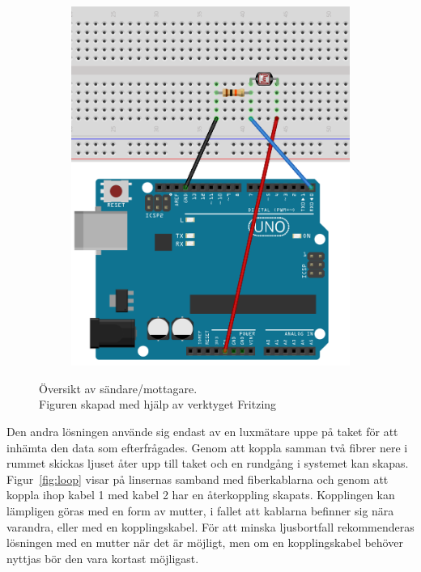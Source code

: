 \begin{figure}[hb]
\begin{subfigure}[b]{0.35\textwidth}
                    \includegraphics[width=\textwidth]{res/img/resistor}    
                \end{subfigure}
            \caption[Översikt av sändare/mottagare]{Översikt av sändare/mottagare. \\\tiny{Figuren skapad med hjälp av verktyget Fritzing \cite{fritz}}}\label{fig:schema}
            \end{figure}

            \newpage
            
            Den andra lösningen använde sig endast av en luxmätare uppe på taket för att inhämta den data som efterfrågades. Genom att koppla samman två fibrer nere i rummet skickas ljuset åter upp till taket och en rundgång i systemet kan skapas. Figur~\ref{fig:loop} visar på linsernas samband med fiberkablarna och genom att koppla ihop kabel 1 med kabel 2 har en återkoppling skapats. Kopplingen kan lämpligen göras med en form av mutter, i fallet att kablarna befinner sig nära varandra, eller med en kopplingskabel. För att minska ljusbortfall rekommenderas lösningen med en mutter när det är möjligt, men om en kopplingskabel behöver nyttjas bör den vara kortast möjligast.\bigskip 

